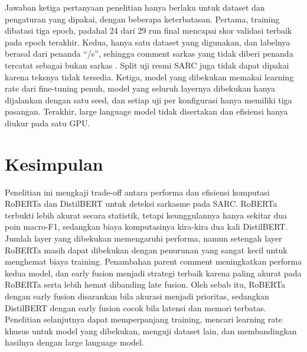 \documentclass[conference]{IEEEtran}
\begin{document}
Jawaban ketiga pertanyaan penelitian hanya berlaku untuk dataset dan pengaturan yang dipakai, dengan beberapa keterbatasan. Pertama, training dibatasi tiga epoch, padahal 24 dari 29 run final mencapai skor validasi terbaik pada epoch terakhir. Kedua, hanya satu dataset yang digunakan, dan labelnya berasal dari penanda ``/s'', sehingga comment sarkas yang tidak diberi penanda tercatat sebagai bukan sarkas \cite{khodak2018sarc}. Split uji resmi SARC juga tidak dapat dipakai karena teksnya tidak tersedia. Ketiga, model yang dibekukan memakai learning rate dari fine-tuning penuh, model yang seluruh layernya dibekukan hanya dijalankan dengan satu seed, dan setiap uji per konfigurasi hanya memiliki tiga pasangan. Terakhir, large language model tidak disertakan dan efisiensi hanya diukur pada satu GPU.

\section{Kesimpulan}
Penelitian ini mengkaji trade-off antara performa dan efisiensi komputasi RoBERTa dan DistilBERT untuk deteksi sarkasme pada SARC. RoBERTa terbukti lebih akurat secara statistik, tetapi keunggulannya hanya sekitar dua poin macro-F1, sedangkan biaya komputasinya kira-kira dua kali DistilBERT. Jumlah layer yang dibekukan memengaruhi performa, namun setengah layer RoBERTa masih dapat dibekukan dengan penurunan yang sangat kecil untuk menghemat biaya training. Penambahan parent comment meningkatkan performa kedua model, dan early fusion menjadi strategi terbaik karena paling akurat pada RoBERTa serta lebih hemat dibanding late fusion. Oleh sebab itu, RoBERTa dengan early fusion disarankan bila akurasi menjadi prioritas, sedangkan DistilBERT dengan early fusion cocok bila latensi dan memori terbatas. Penelitian selanjutnya dapat memperpanjang training, mencari learning rate khusus untuk model yang dibekukan, menguji dataset lain, dan membandingkan hasilnya dengan large language model.



\end{document}
